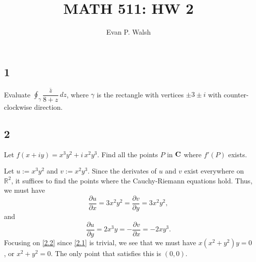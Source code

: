 \documentclass[12pt]{article}
\title{MATH 511: HW 2}
\author{Evan P. Walsh}
\begin{document}
\maketitle


\def\IC{{\bf C}}
\def\({\left (}
\def\){\right )}
\def\zb{\overline z}
\def\dP{\partial}


\subsection*{1}
\begin{tcolorbox}
Evaluate
$\oint_\gamma \dfrac{\overline{z}}{8+z}\,dz$, where $\gamma$ is the
rectangle with vertices $\pm 3\pm i$ with counter-clockwise
direction.
\end{tcolorbox}


\subsection*{2}
\begin{tcolorbox}
Let $f(x+iy)=x^3y^2+i\,x^2y^3$. Find all the points $P$ in $\IC$ where $f'(P)$ exists.
\end{tcolorbox}
Let $u := x^{3}y^{2}$ and $v := x^{2}y^{3}$. Since the derivates of $u$ and $v$ exist everywhere on $\mathbb{R}^{2}$, it suffices to find the points
where the Cauchy-Riemann equations hold. Thus, we must have
\begin{equation}
\frac{\dP u}{\dP x} = 3x^{2}y^{2} = \frac{\dP v}{\dP y} = 3x^{2}y^{2},
\label{2.1}
\end{equation}
and 
\begin{equation}
\frac{\dP u}{\dP y} = 2x^{3}y = -\frac{\dP v}{\dP x} = -2xy^{3}.
\label{2.2}
\end{equation}
Focusing on \eqref{2.2} since \eqref{2.1} is trivial, we see that we must have $x(x^{2} + y^{2})y = 0$, or $x^{2} + y^{2} = 0$. The only point that
satisfies this is $(0,0)$.
\end{document}
